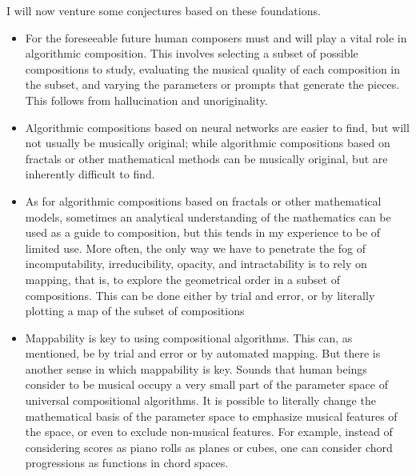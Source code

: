 \documentclass[11pt]{scrartcl}
\begin{document}
I will now venture some conjectures based on these foundations.

\begin{itemize}
\item For the foreseeable future human composers must and will play a vital role in algorithmic composition. This involves selecting a subset of possible compositions to study, evaluating the musical quality of each composition in the subset, and varying the parameters or prompts that generate the pieces. This follows from hallucination and unoriginality.
\item Algorithmic compositions based on neural networks are easier to find, but will not usually be musically original; while algorithmic compositions based on fractals or other mathematical methods can be musically original, but are inherently difficult to find.
\item As for algorithmic compositions based on fractals or other mathematical models, sometimes an analytical understanding of the mathematics can be used as a guide to composition, but this tends in my experience to be of limited use. More often, the only way we have to penetrate the fog of incomputability, irreducibility, opacity, and intractability is to rely on mapping, that is, to explore the geometrical order in a subset of compositions. This can be done either by trial and error, or by literally plotting a map of the subset of compositions
\item Mappability is key to using compositional algorithms. This can, as mentioned, be by trial and error or by automated mapping. But there is another sense in which mappability is key. Sounds that human beings consider to be musical occupy a very small part of the parameter space of universal compositional algorithms. It is possible to literally change the mathematical basis of the parameter space to emphasize musical features of the space, or even to exclude non-musical features. For example, instead of considering scores as piano rolls as planes or cubes, one can consider chord progressions as functions in chord spaces.
\end{itemize}









%
\printbibliography
\end{document}
